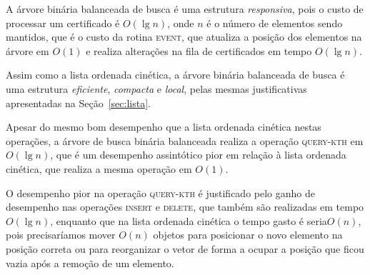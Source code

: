 A árvore binária balanceada de busca é uma estrutura \textit{responsiva}, pois o
custo de processar um certificado é $O(\lg{n})$, onde $n$ é o número de elementos sendo mantidos,
que é o custo da rotina \textsc{event}, que atualiza a posição dos elementos na árvore em $O(1)$ e
realiza alterações na fila de certificados em tempo $O(\lg{n})$.

Assim como a lista ordenada cinética, a árvore binária balanceada de busca é uma
estrutura \textit{eficiente}, \textit{compacta} e \textit{local}, pelas mesmas
justificativas apresentadas na Seção~\ref{sec:lista}.

Apesar do mesmo bom desempenho que a lista ordenada cinética nestas operações, a árvore de busca
binária balanceada realiza a operação \textsc{query-kth} em $O(\lg{n})$, que é um
desempenho assintótico pior em relação à lista ordenada cinética, que realiza a
mesma operação em $O(1)$.

O desempenho pior na operação \textsc{query-kth} é justificado pelo ganho de
desempenho nas operações \textsc{insert} e \textsc{delete}, que também são
realizadas em tempo $O(\lg{n})$, enquanto que na lista ordenada cinética o tempo
gasto é seria$O(n)$, pois precisaríamos mover $O(n)$ objetos para posicionar o novo
elemento na posição correta ou para reorganizar o vetor de forma a ocupar a
posição que ficou vazia após a remoção de um elemento.
